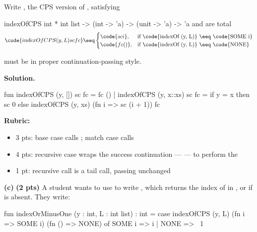 \documentclass[crop=false]{standalone}
\newif\ifsol
\newenvironment{solution}
    {\par\color{solution_color}\begin{framed}\textbf{Solution.}\par}
    {\end{framed}}
\newcommand{\subpts}[1]{\textbf{(#1 pts)}}
\newcommand{\answerspace}[1]{\ifsol\else\vspace{#1}\par\fi}
\begin{document}
Write , the CPS version of , satisfying

\spec
  {indexOfCPS}
  {int * int list -> (int -> 'a) -> (unit -> 'a) -> 'a}
  { and  are total}
  {\vspace{-1.5em}
   {\renewcommand{\arraystretch}{0.9}%
   \[
     \code{indexOfCPS (y, L) sc fc} \eeq
     \begin{cases}
       \code{sc i},  & \text{if \code{indexOf (y, L)} $\eeq$ \code{SOME i}} \\
       \code{fc ()}, & \text{if \code{indexOf (y, L)} $\eeq$ \code{NONE}}
     \end{cases}
   \]}\vspace{-1em}}

\begin{constraint}
   must be in proper continuation-passing style.
\end{constraint}

\answerspace{4cm}

\begin{solution}
\begin{codeblock}
  fun indexOfCPS (y, []) sc fc = fc ()
    | indexOfCPS (y, x::xs) sc fc =
        if y = x then sc 0
        else indexOfCPS (y, xs) (fn i => sc (i + 1)) fc
\end{codeblock}

\textbf{Rubric:}
\begin{itemize}
  \item 3 pts: base case calls ; match case calls 
  \item 4 pts: recursive case wraps the success continuation ---
     --- to perform the 
  \item 1 pt: recursive call is a tail call, passing  unchanged
\end{itemize}
\end{solution}

\vspace{0.5em}

\textbf{(c)} \subpts{2} A student wants to use  to write
, which returns the index of  in , or
 if  is absent. They write:

\begin{codeblock}
  fun indexOrMinusOne (y : int, L : int list) : int =
    case indexOfCPS (y, L) (fn i => SOME i) (fn () => NONE) of
      SOME i => i
    | NONE   => ~1
\end{codeblock}
\end{document}
